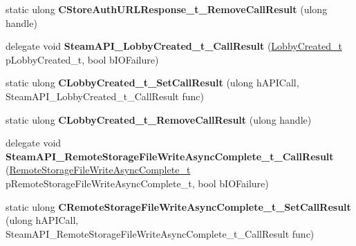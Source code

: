 \begin{DoxyCompactItemize}
\item 
\mbox{\label{class_valve_1_1_interop_1_1_native_entrypoints_ab618b81bbff28a8dcd8c120d8e5810b9}} 
static ulong {\bfseries C\+Store\+Auth\+U\+R\+L\+Response\+\_\+t\+\_\+\+Remove\+Call\+Result} (ulong handle)
\item 
\mbox{\label{class_valve_1_1_interop_1_1_native_entrypoints_a04c3d715ba977751034b9e5fbcc4fff1}} 
delegate void {\bfseries Steam\+A\+P\+I\+\_\+\+Lobby\+Created\+\_\+t\+\_\+\+Call\+Result} (\hyperlink{struct_valve_1_1_steamworks_1_1_lobby_created__t}{Lobby\+Created\+\_\+t} p\+Lobby\+Created\+\_\+t, bool b\+I\+O\+Failure)
\item 
\mbox{\label{class_valve_1_1_interop_1_1_native_entrypoints_a81781117ba4b04f3f9eb9febb80fb67a}} 
static ulong {\bfseries C\+Lobby\+Created\+\_\+t\+\_\+\+Set\+Call\+Result} (ulong h\+A\+P\+I\+Call, Steam\+A\+P\+I\+\_\+\+Lobby\+Created\+\_\+t\+\_\+\+Call\+Result func)
\item 
\mbox{\label{class_valve_1_1_interop_1_1_native_entrypoints_ab21b414412201901b558edc43d156f46}} 
static ulong {\bfseries C\+Lobby\+Created\+\_\+t\+\_\+\+Remove\+Call\+Result} (ulong handle)
\item 
\mbox{\label{class_valve_1_1_interop_1_1_native_entrypoints_add401e5d099da67e6ee263da0712ac6f}} 
delegate void {\bfseries Steam\+A\+P\+I\+\_\+\+Remote\+Storage\+File\+Write\+Async\+Complete\+\_\+t\+\_\+\+Call\+Result} (\hyperlink{struct_valve_1_1_steamworks_1_1_remote_storage_file_write_async_complete__t}{Remote\+Storage\+File\+Write\+Async\+Complete\+\_\+t} p\+Remote\+Storage\+File\+Write\+Async\+Complete\+\_\+t, bool b\+I\+O\+Failure)
\item 
\mbox{\label{class_valve_1_1_interop_1_1_native_entrypoints_a7dbec9d972dfb4cab23dbb1aeaef58e8}} 
static ulong {\bfseries C\+Remote\+Storage\+File\+Write\+Async\+Complete\+\_\+t\+\_\+\+Set\+Call\+Result} (ulong h\+A\+P\+I\+Call, Steam\+A\+P\+I\+\_\+\+Remote\+Storage\+File\+Write\+Async\+Complete\+\_\+t\+\_\+\+Call\+Result func)

\end{DoxyCompactItemize}
